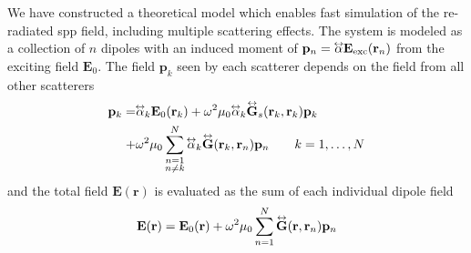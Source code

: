 We have constructed a theoretical model which enables fast simulation of
the re-radiated \gls{spp} field, including multiple scattering effects. The
system is modeled as a collection of $n$ dipoles with an induced moment of
$\mathbf{p}_n=\tensor{\alpha} \mathbf{E}_\mathrm{exc}(\mathbf{r}_n)$
from the exciting field $\mathbf{E}_0$. The field $\mathbf{p}_k$ seen by
each scatterer depends on the field from all other scatterers
\begin{align}
\mathbf{p}_k =& \tensor{\alpha}_k \mathbf{E}_0(\mathbf{r}_k)
+\omega^2 \mu_0 \tensor{\alpha}_k \tensor{\mathbf{G}}_s(\mathbf{r}_k,\mathbf{r}_k)\mathbf{p}_k\\
+& \omega^2\mu_0 \sum_{\substack{n=1\\n \ne k}}^N
\tensor{\alpha}_k
\tensor{\mathbf{G}}(\mathbf{r}_k,\mathbf{r}_n)\mathbf{p}_n\qquad k=1,\ldots,N
\end{align}
and the total field $\mathbf{E}(\mathbf{r})$ is evaluated as the sum of each individual dipole field
\begin{equation}
\mathbf{E}(\mathbf{r}) = \mathbf{E}_0(\mathbf{r}) + \omega^2 \mu_0
\sum_{n=1}^{N} \tensor{\mathbf{G}}(\mathbf{r},\mathbf{r}_n) \mathbf{p}_n
\end{equation}

